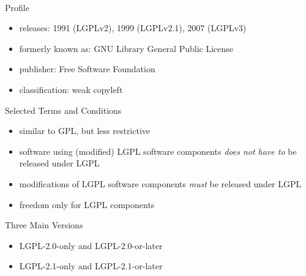 \begin{frame}{\insertsubsection\ } %
	\begin{fancycolumns}
		\begin{definition}{Profile}
			\begin{itemize}
				\item releases: 1991 (LGPLv2), 1999 (LGPLv2.1), 2007 (LGPLv3)
				\item formerly known as: GNU Library General Public License
				\item publisher: Free Software Foundation
				\item classification: weak copyleft
			\end{itemize}
		\end{definition}
		\begin{example}{Selected Terms and Conditions}
			\begin{itemize}
				\item similar to GPL, but less restrictive
				\item software using (modified) LGPL software components \emph{does not have to} be released under LGPL
				\item modifications of LGPL software components \emph{must} be released under LGPL %
				\item freedom only for LGPL components
			\end{itemize}
		\end{example}
		\nextcolumn
		\begin{exampletight}{}
			\centering{}
		\end{exampletight}
		\begin{note}{Three Main Versions}
			\begin{itemize}
				\item LGPL-2.0-only and LGPL-2.0-or-later
				\item LGPL-2.1-only and LGPL-2.1-or-later

\end{itemize}
\end{note}
\end{fancycolumns}
\end{frame}
